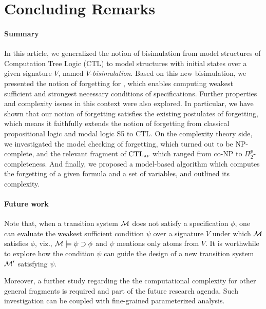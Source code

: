 \documentclass[letterpaper]{article} %
\begin{document}
 


\section{Concluding Remarks}
\paragraph{Summary}
In this article, we generalized the notion of bisimulation from model structures of Computation Tree Logic (CTL) to model structures with initial states over a given signature $V$, named $V$-{\em bisimulation}.
Based on this new bisimulation, we presented the notion of forgetting for \CTL, which enables computing weakest sufficient and strongest necessary conditions of specifications. Further properties and complexity issues in this context were also explored. In particular, we have shown that our notion of forgetting satisfies the existing postulates of forgetting, which means it faithfully extends the notion of forgetting from classical propositional logic and modal logic S5 to CTL. On the complexity theory side, we investigated the model checking of forgetting, which turned out to be NP-complete, and the relevant fragment of $\textrm{CTL}_{\textsc{a}\textsc{f}}$ which ranged from co-NP to $\Pi_2^p$-completeness.  And finally, we proposed a model-based algorithm which computes the forgetting of a given formula and a set of variables, and outlined its complexity.




\paragraph{Future work}
Note that, when a transition system $\cal M$ does not satisfy a specification $\phi$, one can evaluate the weakest sufficient condition  $\psi$ over a signature $V$ under which ${\cal M}$ satisfies $\phi$, viz., ${\cal M}\models\psi\supset \phi$ and $\psi$ mentions only atoms from $V$. It is worthwhile to explore how the condition $\psi$ can guide the design of a new transition system ${\cal M}'$ satisfying $\psi$.



Moreover, a further study regarding the the computational complexity for other general fragments is required and part of the future research agenda. Such investigation can be coupled with fine-grained parameterized analysis.





\clearpage
\appendix
\end{document}
